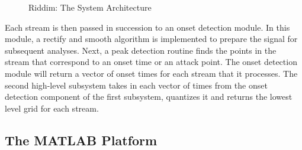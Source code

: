\begin{figure}[thp]
  \begin{center}
    \caption{Riddim: The System Architecture }
    \label{system architecture}
  \end{center}
\end{figure}

Each stream is then passed in succession to an onset detection module.
In this module, a rectify and smooth algorithm is implemented to
prepare the signal for subsequent analyses. Next, a peak detection 
routine finds the points in the stream that correspond to an onset
time or an attack point. The onset detection module will 
return a vector of onset times for each stream that it processes. The 
second high-level subsystem takes in each vector of times from the onset
detection component of the first subsystem, quantizes it and returns the 
lowest level grid for each stream. 

\vspace{5mm}
\subsection{The MATLAB{\texttrademark} Platform}

